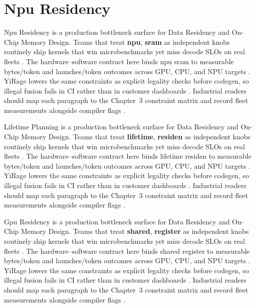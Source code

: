 \section{Npu Residency}
\label{sec:npu_residency}

Npu Residency is a production bottleneck surface for Data Residency and On-Chip Memory Design. Teams that treat \textbf{npu}, \textbf{sram} as independent knobs routinely ship kernels that win microbenchmarks yet miss decode SLOs on real fleets \citep{nvidia2022hopper,amd2024aie}. The hardware--software contract here binds npu sram to measurable bytes/token and launches/token outcomes across GPU, CPU, and NPU targets \citep{semianalysis2024tma,dlbook}. YiRage lowers the same constraints as explicit legality checks before codegen, so illegal fusion fails in CI rather than in customer dashboards \citep{amd2024xdna,dao2022flashattention}. Industrial readers should map each paragraph to the Chapter~3 constraint matrix and record fleet measurements alongside compiler flags \citep{amd2024aie,kwon2023vllm}.

Lifetime Planning is a production bottleneck surface for Data Residency and On-Chip Memory Design. Teams that treat \textbf{lifetime}, \textbf{residen} as independent knobs routinely ship kernels that win microbenchmarks yet miss decode SLOs on real fleets \citep{taxbreak2026,semianalysis2024tma}. The hardware--software contract here binds lifetime residen to measurable bytes/token and launches/token outcomes across GPU, CPU, and NPU targets \citep{memoryfloor2026,amd2024xdna}. YiRage lowers the same constraints as explicit legality checks before codegen, so illegal fusion fails in CI rather than in customer dashboards \citep{nvidia2022hopper,amd2024aie}. Industrial readers should map each paragraph to the Chapter~3 constraint matrix and record fleet measurements alongside compiler flags \citep{semianalysis2024tma,dlbook}.

Gpu Residency is a production bottleneck surface for Data Residency and On-Chip Memory Design. Teams that treat \textbf{shared}, \textbf{register} as independent knobs routinely ship kernels that win microbenchmarks yet miss decode SLOs on real fleets \citep{memoryfloor2026,amd2024xdna}. The hardware--software contract here binds shared register to measurable bytes/token and launches/token outcomes across GPU, CPU, and NPU targets \citep{nvidia2022hopper,amd2024aie}. YiRage lowers the same constraints as explicit legality checks before codegen, so illegal fusion fails in CI rather than in customer dashboards \citep{semianalysis2024tma,dlbook}. Industrial readers should map each paragraph to the Chapter~3 constraint matrix and record fleet measurements alongside compiler flags \citep{amd2024xdna,dao2022flashattention}.

